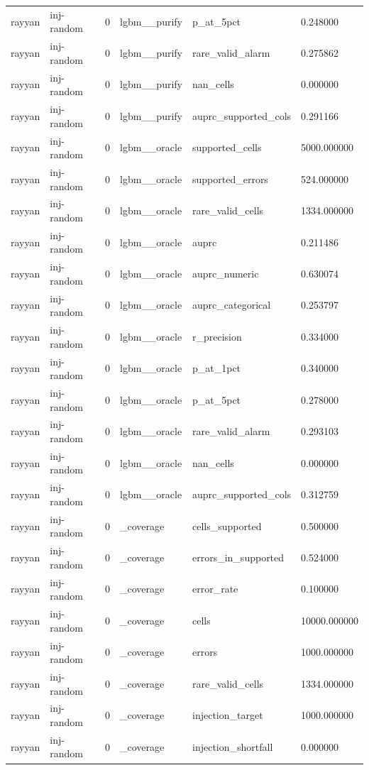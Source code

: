 \begin{tabular}{llllll}
rayyan & inj-random & 0 & lgbm\_\_purify & p\_at\_5pct & 0.248000 \\
rayyan & inj-random & 0 & lgbm\_\_purify & rare\_valid\_alarm & 0.275862 \\
rayyan & inj-random & 0 & lgbm\_\_purify & nan\_cells & 0.000000 \\
rayyan & inj-random & 0 & lgbm\_\_purify & auprc\_supported\_cols & 0.291166 \\
rayyan & inj-random & 0 & lgbm\_\_oracle & supported\_cells & 5000.000000 \\
rayyan & inj-random & 0 & lgbm\_\_oracle & supported\_errors & 524.000000 \\
rayyan & inj-random & 0 & lgbm\_\_oracle & rare\_valid\_cells & 1334.000000 \\
rayyan & inj-random & 0 & lgbm\_\_oracle & auprc & 0.211486 \\
rayyan & inj-random & 0 & lgbm\_\_oracle & auprc\_numeric & 0.630074 \\
rayyan & inj-random & 0 & lgbm\_\_oracle & auprc\_categorical & 0.253797 \\
rayyan & inj-random & 0 & lgbm\_\_oracle & r\_precision & 0.334000 \\
rayyan & inj-random & 0 & lgbm\_\_oracle & p\_at\_1pct & 0.340000 \\
rayyan & inj-random & 0 & lgbm\_\_oracle & p\_at\_5pct & 0.278000 \\
rayyan & inj-random & 0 & lgbm\_\_oracle & rare\_valid\_alarm & 0.293103 \\
rayyan & inj-random & 0 & lgbm\_\_oracle & nan\_cells & 0.000000 \\
rayyan & inj-random & 0 & lgbm\_\_oracle & auprc\_supported\_cols & 0.312759 \\
rayyan & inj-random & 0 & \_coverage & cells\_supported & 0.500000 \\
rayyan & inj-random & 0 & \_coverage & errors\_in\_supported & 0.524000 \\
rayyan & inj-random & 0 & \_coverage & error\_rate & 0.100000 \\
rayyan & inj-random & 0 & \_coverage & cells & 10000.000000 \\
rayyan & inj-random & 0 & \_coverage & errors & 1000.000000 \\
rayyan & inj-random & 0 & \_coverage & rare\_valid\_cells & 1334.000000 \\
rayyan & inj-random & 0 & \_coverage & injection\_target & 1000.000000 \\
rayyan & inj-random & 0 & \_coverage & injection\_shortfall & 0.000000 \\

\end{tabular}
